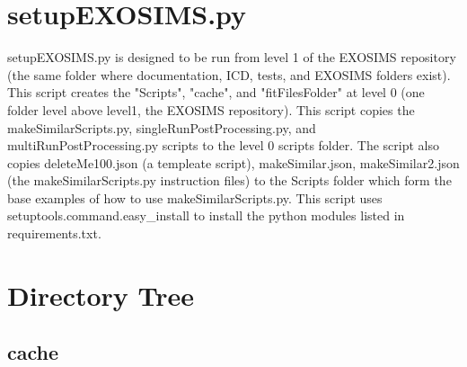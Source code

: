 \documentclass[12pt]{article}
\begin{document}
\maketitle


\section{setupEXOSIMS.py}
setupEXOSIMS.py is designed to be run from level 1 of the EXOSIMS repository (the same folder where documentation, ICD, tests, and EXOSIMS folders exist).
This script creates the "Scripts", "cache", and "fitFilesFolder"  at level 0 (one folder level above level1, the EXOSIMS repository).
This script copies the makeSimilarScripts.py, singleRunPostProcessing.py, and multiRunPostProcessing.py scripts to the level 0 scripts folder.
The script also copies deleteMe100.json (a templeate script), makeSimilar.json, makeSimilar2.json (the makeSimilarScripts.py instruction files) to the Scripts folder which form the base examples of how to use makeSimilarScripts.py. 
This script uses setuptools.command.easy\_install to install the python modules listed in requirements.txt.


\section{Directory Tree}

\subsection{cache}
\end{document}
